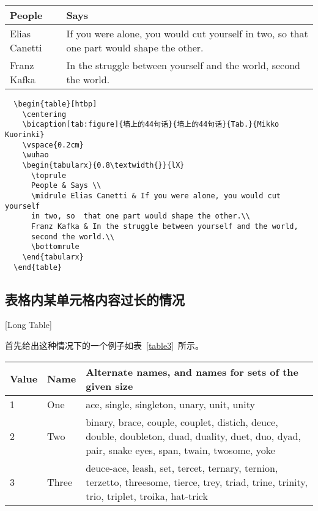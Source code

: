 \begin{table}[htbp]
  \centering
  \vspace{0.2cm}
  \wuhao
  \begin{tabularx}{0.8\textwidth{}}{lX}
    \toprule
    People & Says \\
    \midrule
    Elias Canetti & If you were alone, you would cut yourself in two, so
    that one part would shape the other.\\
    Franz Kafka & In the struggle between yourself and the world,
    second the world.\\
    \bottomrule
  \end{tabularx}
\end{table}

\begin{lstlisting}
  \begin{table}[htbp]
    \centering
    \bicaption[tab:figure]{墙上的44句话}{墙上的44句话}{Tab.}{Mikko Kuorinki}
    \vspace{0.2cm}
    \wuhao
    \begin{tabularx}{0.8\textwidth{}}{lX}
      \toprule
      People & Says \\
      \midrule Elias Canetti & If you were alone, you would cut yourself
      in two, so  that one part would shape the other.\\
      Franz Kafka & In the struggle between yourself and the world,
      second the world.\\
      \bottomrule
    \end{tabularx}
  \end{table}
\end{lstlisting}

\subsection{表格内某单元格内容过长的情况}[Long Table]

首先给出这种情况下的一个例子如表~\ref{table3}~所示。
\begin{table}[htbp]
  \centering
{}\vspace{0.5em}\wuhao
\begin{tabularx}{0.7\textwidth}{llX}
\toprule[1.5pt]
Value & Name & Alternate names, and names for sets of the given size\\\midrule[1pt]
1 & One & ace, single, singleton, unary, unit, unity\\
2 & Two & binary, brace, couple, couplet, distich, deuce, double, doubleton, duad, duality, duet, duo, dyad, pair, snake eyes, span, twain, twosome, yoke\\
3 & Three & deuce-ace, leash, set, tercet, ternary, ternion, terzetto, threesome, tierce, trey, triad, trine, trinity, trio, triplet, troika, hat-trick\\\bottomrule[1.5pt]
\end{tabularx}
\end{table}

